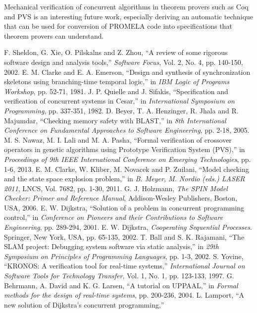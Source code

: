 \documentclass[conference]{IEEEtran}
\begin{document}
Mechanical verification of concurrent algorithms in theorem provers such as Coq \cite{32} and PVS \cite{18} is an interesting future work, 
especially deriving an automatic technique that can be used for conversion of PROMELA code into specifications that theorem provers 
can understand.
\begin{thebibliography}{50}
 F. Sheldon, G. Xie, O. Pilskalns and Z. Zhou, ``A review of some rigorous software design and analysis tools,'' 
\emph{Software Focus}, Vol. 2, No. 4, pp. 140-150, 2002.
 E. M. Clarke and E. A. Emerson, ``Design and synthesis of synchronization skeletons using branching-time temporal logic,'' 
in \emph{IBM Logic of Programs Workshop}, pp. 52-71, 1981. 
 J. P. Quielle and J. Sifakis, ``Specification and verification of concurrent systems in Cesar,'' 
in \emph{International Symposium on Programming}, pp. 337-351, 1982.
 D. Beyer, T. A. Henzinger, R. Jhala and R. Majumdar, ``Checking memory safety with BLAST,'' 
in \emph{8th International Conference on Fundamental Approaches to Software Engineering}, pp. 2-18, 2005. 
 M. S. Nawaz, M. I. Lali and M. A. Pasha, ``Formal verification of crossover operators in genetic algorithms using Prototype Verification 
System (PVS),'' in \emph{Proceedings of 9th IEEE International Conference on Emerging Technologies}, pp. 1-6, 2013.
 E. M. Clarke, W. Kliber, M. Novacek and P. Zuilani, ``Model checking and the state space explosion problem,'' 
in \emph{B. Meyer, M. Nordio (eds.) LASER 2011}, LNCS, Vol. 7682, pp. 1-30, 2011.
 G. J. Holzmann, \emph{The SPIN Model Checker: Primer and Reference Manual}, Addison-Wesley Publishers, Boston, USA, 2006. 
 E. W. Dijkstra, ``Solution of a problem in concurrent programming control,'' 
in \emph{Conference on Pioneers and their Contributions to Software Engineering}, pp. 289-294, 2001.
 E. W. Dijkstra, \emph{Cooperating Sequential Processes}.  Springer, New York, USA, pp. 65-135, 2002. 
 T. Ball and S. K. Rajamani, ``The SLAM project: Debugging system software via static analysis,'' 
in \emph{29th Symposium on Principles of Programming Languages}, pp. 1-3, 2002.
 S. Yovine, ``KRONOS:  A verification tool for real-time systems,'' 
\emph{International Journal on Software Tools for Technology Transfer}, Vol. 1, No. 1, pp. 123-133, 1997.
 G. Behrmann, A. David and K. G. Larsen, ``A tutorial on UPPAAL,'' 
in \emph{Formal methods for the design of real-time systems}, pp. 200-236, 2004.
 L. Lamport, ``A new solution of Dijkstra's concurrent programming,'' 

\end{thebibliography}
\end{document}
